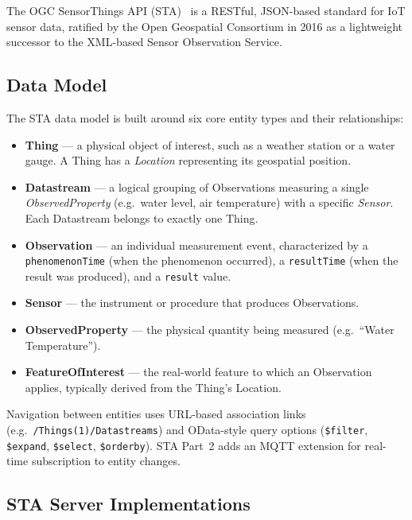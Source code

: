 The OGC SensorThings API (STA)~\cite{ogc-sta} is a RESTful, JSON-based standard for IoT
sensor data, ratified by the Open Geospatial Consortium in 2016 as a lightweight successor
to the XML-based Sensor Observation Service.

\subsection{Data Model}
\label{sec:bg-sta-model}

The STA data model is built around six core entity types and their relationships:

\begin{itemize}
  \item \textbf{Thing} --- a physical object of interest, such as a weather station or a water gauge.
        A Thing has a \emph{Location} representing its geospatial position.
  \item \textbf{Datastream} --- a logical grouping of Observations measuring a single
        \emph{ObservedProperty} (e.g.\ water level, air temperature) with a specific \emph{Sensor}.
        Each Datastream belongs to exactly one Thing.
  \item \textbf{Observation} --- an individual measurement event, characterized by a
        \texttt{phenomenonTime} (when the phenomenon occurred), a \texttt{resultTime} (when the
        result was produced), and a \texttt{result} value.
  \item \textbf{Sensor} --- the instrument or procedure that produces Observations.
  \item \textbf{ObservedProperty} --- the physical quantity being measured (e.g.\
        ``Water Temperature'').
  \item \textbf{FeatureOfInterest} --- the real-world feature to which an Observation applies,
        typically derived from the Thing's Location.
\end{itemize}

Navigation between entities uses URL-based association links
(e.g.\ \texttt{/Things(1)/Datastreams}) and OData-style query options (\texttt{\$filter},
\texttt{\$expand}, \texttt{\$select}, \texttt{\$orderby}). STA Part~2 adds an MQTT
extension for real-time subscription to entity changes.

\subsection{STA Server Implementations}
\label{sec:bg-frost}

